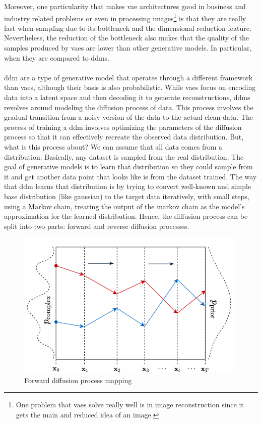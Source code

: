 \documentclass[11pt, a4paper]{article}
\begin{document}
	Moreover, one particularity that makes \gls{vae} architectures good in business and industry related problems or even in processing images\footnote{One problem that \gls{vae}s solve really well is in image reconstruction since it gets the main and reduced idea of an image.} is that they are really fast when sampling due to its bottleneck and the dimensional reduction feature. Nevertheless, the reduction of the bottleneck also makes that the quality of the samples produced by \gls{vae}s are lower than other generative models. In particular, when they are compared to \gls{ddm}s.
	\\
	\\
	\gls{ddm} are a type of generative model that operates through a different framework than \gls{vae}s, although their basis is also probabilistic. While \gls{vae}s focus on encoding data into a latent space and then decoding it to generate reconstructions, \gls{ddm}s revolves around modeling the diffusion process of data. This process involves the gradual transition from a noisy version of the data to the actual clean data. 
	The process of training a \gls{ddm} involves optimizing the parameters of the diffusion process so that it can effectively recreate the observed data distribution. But, what is this process about? 
	We can assume that all data comes from a distribution. Basically, any dataset is sampled from the real distribution. The goal of generative models is to learn that distribution so they could sample from it and get another data point that looks like is from the dataset trained. The way that \gls{ddm} learns that distribution is by trying to convert well-known and simple base distribution (like gaussian) to the target data iteratively, with small steps, using a Markov chain, treating the output of the markov chain as the model's approximation for the learned distribution. Hence, the diffusion process can be split into two parts: forward and reverse diffusion processes.
	\begin{figure}[H]
		\centering
		\includegraphics[width=11cm]{imgs/relatedwork/forward-diffusion-prob}
		\caption{Forward diffusion process mapping}
		\label{fig:related-forward-diffusion-prob}
	\end{figure}
\end{document}
